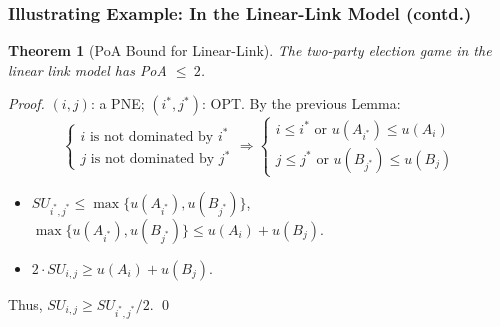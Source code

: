 \documentclass[xcolor=dvipsnames,envcountsect]{beamer}
\newtheorem*{theory}{Theorem}
\begin{document}
\begin{frame}
\frametitle{Illustrating Example: In the Linear-Link Model (contd.)}
\begin{theory}[PoA Bound for Linear-Link]
	The two-party election game in the linear link model 
	has PoA $\leq~2$. 
\end{theory}
\begin{proof}
	$(i,j)$: a PNE; $(i^*,j^*)$: OPT. By the previous Lemma: 
	\[
	\left\{\begin{array}{l}
		i \mbox{ is not dominated by } i^*\\
		j \mbox{ is not dominated by } j^*
	\end{array}
	\right.
	\Rightarrow
	\left\{\begin{array}{l}
		i\leq i^*\mbox{ or } u(A_{i^*})\leq u(A_i)\\
		j\leq j^*\mbox{ or } u(B_{j^*})\leq u(B_j)
	\end{array}
	\right.
	\]
	\vspace{-7pt}
	\begin{itemize}
	\item $SU_{i^*,j^*}\leq \max\{u(A_{i^*}), u(B_{j^*})\}$,  $\max\{u(A_{i^*}), u(B_{j^*})\}\leq u(A_i)+u(B_j)$.
	\item $2\cdot SU_{i,j}\geq u(A_i)+u(B_j)$.
	\end{itemize} 
	Thus, $SU_{i,j}\geq SU_{i^*,j^*}/2$. 
	\qed
\end{proof}
\end{frame}
\end{document}
